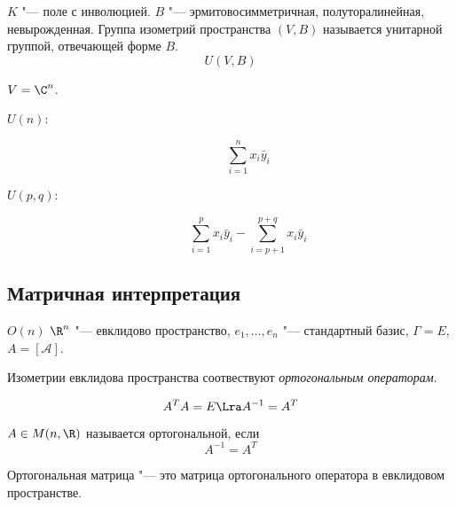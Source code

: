 \begin{Def}
	$K$ "--- поле с инволюцией.
	$B$ "--- эрмитовосимметричная, полуторалинейная, невырожденная.
	Группа изометрий пространства $(V, B)$ называется унитарной группой, отвечающей форме $B$.
	\[ U(V, B) \]
\end{Def}

\begin{exmp}
	$V = \C^n$.
	\begin{description}
	\item[$U(n)$:]
		\[ \sum_{i=1}^n x_i \bar y_i \]

	\item[$U(p, q)$:]
		\[ \sum_{i=1}^p x_i \bar y_i - \sum_{i=p+1}^{p+q} x_i \bar y_i \]
	\end{description}
\end{exmp}

\subsection{Матричная интерпретация}

$O(n)$ %
$\R^n$ "--- евклидово пространство, $e_1, \dots, e_n$ "--- стандартный базис, $\Gamma = E$, $A = [\mathcal A]$.

\begin{Def}
	Изометрии евклидова пространства соотвествуют \textit{ортогональным операторам}.
\end{Def}
\[ A^T A = E \Lra A^{-1} = A^T \]
\begin{Def}
	$A \in M(n, \R)$ называется ортогональной, если
	\[ A^{-1} = A^T \]
\end{Def}

Ортогональная матрица "--- это матрица ортогонального оператора в евклидовом пространстве.

